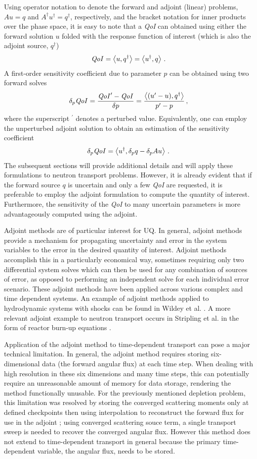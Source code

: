 \documentclass{article}
\newcommand{\bra}{\left\langle}
\newcommand{\ket}{\right\rangle}
\newcommand{\qoi}{{\it QoI}\xspace}
\begin{document}
Using operator notation to denote the forward and adjoint (linear) problems, $Au=q$ and $A^\dag u^\dag = q^\dag$, respectively, and the bracket notation for inner products over the phase space, it is easy to note that a \qoi can 
obtained using either the forward solution $u$ folded with the response function of interest (which is also the adjoint source, $q^\dag$)
\[
\qoi = \bra u, q^\dag \ket = \bra u^\dag, q \ket \,.
\]
A first-order sensitivity coefficient due to parameter $p$ can be obtained using two forward solves
\[
\delta_p \qoi = \frac{\qoi^\prime - \qoi}{\delta p} = \frac{ \bra (u^\prime - u), q^\dag \ket}{p^\prime - p}  \,,
\]
where the superscript $^\prime$ denotes a perturbed value. Equivalently, one can employ the unperturbed adjoint solution to obtain
an estimation of the sensitivity coefficient
\[
\delta_p \qoi = \bra u^\dag, \delta_p q - \delta_p A u \ket \,.
\]
The subsequent sections will provide additional details and will apply these formulations to neutron transport problems. However, it is already evident that if the forward source $q$ is uncertain and only a few \qoi are requested, it is preferable to employ the adjoint formulation to compute the quantity of interest. Furthermore, the sensitivity of the
\qoi to many uncertain parameters is more advantageously computed using the adjoint.


Adjoint methods are of particular interest for UQ. In general, adjoint methods provide a mechanism for propagating uncertainty and error in the system variables to the error in the desired quantity of interest. Adjoint methods accomplish this in a particularly economical way, sometimes requiring only two differential system solves which can then be used for any combination of sources of error, as opposed to performing an independent solve for each individual error scenario. These adjoint methods have been applied across various complex and time dependent systems. An example of adjoint methods applied to hydrodynamic systems with shocks can be found in Wildey et al. \cite{Wildey}. A more relevant adjoint example to neutron transport occurs in Stripling et al. in the form of reactor burn-up equations \cite{Stripling}.


Application of the adjoint method to time-dependent transport can pose a major technical limitation. In general, the adjoint method requires storing six-dimensional data (the forward angular flux) at each time step. When dealing with high resolution in these six dimensions and many time steps, this can potentially require an unreasonable amount of memory for data storage, rendering the method functionally unusable. For the previously mentioned depletion problem, this limitation was resolved by storing the converged scattering moments only at defined checkpoints then using interpolation to reconstruct the forward flux for use in the adjoint \cite{Stripling};
using converged scattering souce term, a single transport sweep is needed to recover the converged
angular flux. However this method does not extend to time-dependent transport in general because
the primary time-dependent variable, the angular flux, needs to be stored. 
\end{document}
